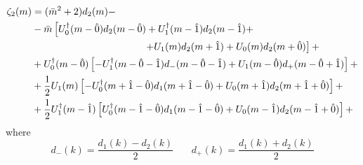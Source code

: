 \begin{equation*}
    \begin{split}
     \zeta_2(m) &= (\Bar{m}^2 + 2) d_2(m) - \\
     & - \Bar{m} \left[ U_0^\dagger(m - \hat{0}) d_2(m - \hat{0}) + U_1^\dagger(m - \hat{1}) d_2(m-\hat{1}) + \right. \\ 
     & \hspace{40mm} \left. + U_1(m) d_2(m + \hat{1}) + U_0 (m) d_2(m + \hat{0}) \right] + \\
     & + U_0^\dagger (m - \hat{0}) \left[ - U_1^\dagger(m - \hat{0} - \hat{1}) d_-(m - \hat{0} - \hat{1}) + U_1(m - \hat{0}) d_+(m - \hat{0} + \hat{1}) \right] +  \\ 
     & + \frac{1}{2} U_1 (m) \left[ -U_0^\dagger(m + \hat{1} - \hat{0}) d_1(m + \hat{1} - \hat{0}) + U_0(m + \hat{1}) d_2(m + \hat{1} + \hat{0}) \right] +  \\ 
     & + \frac{1}{2} U_1^\dagger (m - \hat{1}) \left[ U_0^\dagger(m - \hat{1} - \hat{0}) d_1(m - \hat{1} - \hat{0}) + U_0(m - \hat{1}) d_2(m - \hat{1} + \hat{0}) \right] +  \\ 
    \end{split}
\end{equation*}
where
\begin{equation*}
    d_-(k) = \frac{d_1 (k) - d_2(k)}{2} \,\,\,\,\,\,\,\,\,\,\, d_+(k) = \frac{d_1 (k) + d_2 (k)}{2}
\end{equation*}